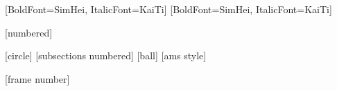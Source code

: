 \usepackage{xcolor}
\usepackage{appendixnumberbeamer}
\usepackage{bookmark}
\usepackage{ctex}
\usepackage{caption}
\usepackage{subfigure}
\usepackage{fontspec}
\usepackage{amsmath}
\usepackage{amsthm}
\usepackage{unicode-math}
\usepackage{amssymb}
\usepackage{graphicx}
\usepackage{float}
\usepackage{color}
\usepackage[
    backend=biber,
    style=authoryear,
    sorting = nty,
    hyperref=true,
    doi=false
]{biblatex}



\setmainfont[Scale=1.0]{STIX Two Text}
\setsansfont[
    BoldFont={STIX Two Text SemiBold},
    ItalicFont={STIX Two Text Italic}
    ]{Arial}
[BoldFont=SimHei, ItalicFont=KaiTi]
[BoldFont=SimHei, ItalicFont=KaiTi]

[numbered]
\setlength{}

[circle]
[subsections numbered]
[ball]
[ams style]

[frame number]

\theoremstyle{remark}
\newtheorem{assump}[theorem]{Identification Assumption}

\newenvironment{wideitemize}{\itemize\addtolength{\itemsep}{0.5em} }{\enditemize}